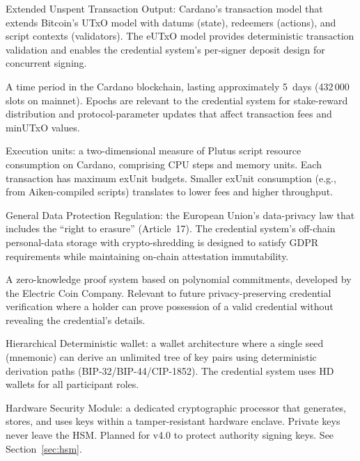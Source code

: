 \begin{description}[style=nextline, leftmargin=2.5cm, labelwidth=2.3cm]
\item[eUTxO]
  Extended Unspent Transaction Output: Cardano's transaction model that
  extends Bitcoin's UTxO model with datums (state), redeemers (actions), and
  script contexts (validators).  The eUTxO model provides deterministic
  transaction validation and enables the credential system's per-signer
  deposit design for concurrent signing.

\item[Epoch]
  A time period in the Cardano blockchain, lasting approximately 5~days
  (432\,000 slots on mainnet).  Epochs are relevant to the credential system
  for stake-reward distribution and protocol-parameter updates that affect
  transaction fees and minUTxO values.

\item[exUnits]
  Execution units: a two-dimensional measure of Plutus script resource
  consumption on Cardano, comprising CPU steps and memory units.  Each
  transaction has maximum exUnit budgets.  Smaller exUnit consumption (e.g.,
  from Aiken-compiled scripts) translates to lower fees and higher
  throughput.

\item[GDPR]
  General Data Protection Regulation: the European Union's data-privacy law
  that includes the ``right to erasure'' (Article~17).  The credential
  system's off-chain personal-data storage with crypto-shredding is designed
  to satisfy GDPR requirements while maintaining on-chain attestation
  immutability.

\item[Halo2]
  A zero-knowledge proof system based on polynomial commitments, developed by
  the Electric Coin Company.  Relevant to future privacy-preserving
  credential verification where a holder can prove possession of a valid
  credential without revealing the credential's details.

\item[HD Wallet]
  Hierarchical Deterministic wallet: a wallet architecture where a single
  seed (mnemonic) can derive an unlimited tree of key pairs using
  deterministic derivation paths (BIP-32/BIP-44/CIP-1852).  The credential
  system uses HD wallets for all participant roles.

\item[HSM]
  Hardware Security Module: a dedicated cryptographic processor that
  generates, stores, and uses keys within a tamper-resistant hardware
  enclave.  Private keys never leave the HSM.  Planned for v4.0 to protect
  authority signing keys.  See Section~\ref{sec:hsm}.


\end{description}
